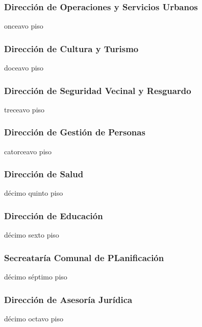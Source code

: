 \subsubsection{Dirección de Operaciones y Servicios Urbanos}
 {onceavo piso}

\subsubsection{Dirección de Cultura y Turismo}
 {doceavo piso}

\subsubsection{Dirección de Seguridad Vecinal y Resguardo}
 {treceavo piso}

\subsubsection{Dirección de Gestión de Personas}
 {catorceavo piso}

\subsubsection{Dirección de Salud}
 {décimo quinto piso}

\subsubsection{Dirección de Educación}
 {décimo sexto piso}

\subsubsection{Secreataría Comunal de PLanificación}
 {décimo séptimo piso}

\subsubsection{Dirección de Asesoría Jurídica}
 {décimo octavo piso}

